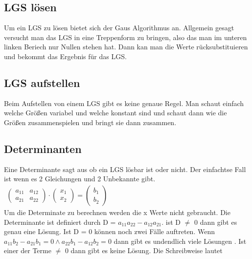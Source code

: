 \documentclass[a4paper,10pt]{scrartcl}
\begin{document}
        \subsection{LGS lösen}
            Um ein LGS zu lösen bietet sich der Gaus Algorithmus an. Allgemein gesagt versucht man das LGS in eine Treppenform zu bringen, also das man im unteren linken Beriech nur Nullen stehen hat.
            Dann kan man die Werte rücksubstituieren und bekommt das Ergebnis für das LGS.
        \subsection{LGS aufstellen}
            Beim Aufstellen von einem LGS gibt es keine genaue Regel. Man schaut einfach welche Größen variabel und welche konstant sind und schaut dann wie die Größen zusammenspielen und 
            bringt sie dann zusammen.
        \subsection{Determinanten}
        Eine Determinante sagt aus ob ein LGS lösbar ist oder nicht. Der einfachtse Fall ist wenn es 2 Gleichungen und 2 Unbekannte gibt. \\
        $\begin{array}{c}
            \begin{pmatrix}
                a_{11} & a_{12} \\
                a_{21} & a_{22}
            \end{pmatrix}
            \cdot
            \begin{pmatrix}
                x_{1}  \\
                x_{2} 
            \end{pmatrix}
            =
            \begin{pmatrix}
                b_{1}  \\
                b_{2} 
            \end{pmatrix}
        \end{array}$\\
        Um die Determinate zu berechnen werden die x Werte nicht gebraucht. Die Determinante ist definiert durch D = $a_{11}a_{22} - a_{12}a_{21}$. ist D $\neq$ 0 dann gibt es genau eine Lösung.
        Ist D = 0 können noch zwei Fälle auftreten. Wenn $a_{11}b_2 - a_{21}b_1 = 0 \wedge a_{22}b_1 - a_{12}b_2 = 0 $ dann gibt es undendlich viele Lösungen . Ist einer der Terme $\neq$ 0 dann gibt es keine Lösung.
        Die Schreibweise lautet 
\end{document}
